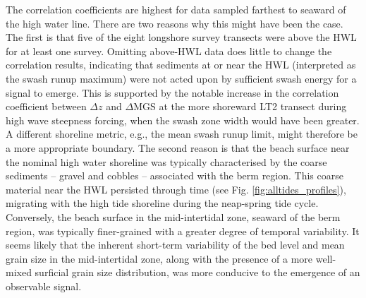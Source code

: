 


The correlation coefficients are highest for data sampled farthest to seaward of the high water line. There are two reasons why this might have been the case. The first is that five of the eight longshore survey transects were above the HWL for at least one survey. Omitting above-HWL data does little to change the correlation results, indicating that sediments at or near the HWL (interpreted as the swash runup maximum) were not acted upon by sufficient swash energy for a signal to emerge. This is supported by the notable increase in the correlation coefficient between $\Delta z$ and $\Delta$MGS at the more shoreward LT2 transect during high wave steepness forcing, when the swash zone width would have been greater. A different shoreline metric, e.g., the mean swash runup limit, might therefore be a more appropriate boundary. The second reason is that the beach surface near the nominal high water shoreline was typically characterised by the coarse sediments -- gravel and cobbles -- associated with the berm region. This coarse material near the HWL persisted through time (see Fig. \ref{fig:alltides_profiles}), migrating with the high tide shoreline during the neap-spring tide cycle. Conversely, the beach surface in the mid-intertidal zone, seaward of the berm region, was typically finer-grained with a greater degree of temporal variability. It seems likely that the inherent short-term variability of the bed level and mean grain size in the mid-intertidal zone, along with the presence of a more well-mixed surficial grain size distribution, was more conducive to the emergence of an observable signal.

